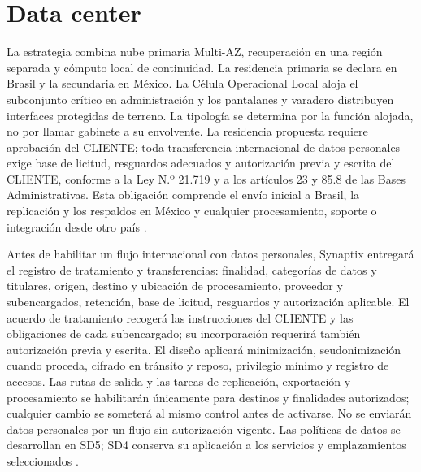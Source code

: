 

\section{Data center}

La estrategia combina nube primaria Multi-AZ, recuperación en una región separada y cómputo local de continuidad. La residencia primaria se declara en Brasil y la secundaria en México. La Célula Operacional Local aloja el subconjunto crítico en administración y los pantalanes y varadero distribuyen interfaces protegidas de terreno. La tipología se determina por la función alojada, no por llamar gabinete a su envolvente. La residencia propuesta requiere aprobación del CLIENTE; toda transferencia internacional de datos personales exige base de licitud, resguardos adecuados y autorización previa y escrita del CLIENTE, conforme a la Ley N.º 21.719 y a los artículos 23 y 85.8 de las Bases Administrativas. Esta obligación comprende el envío inicial a Brasil, la replicación y los respaldos en México y cualquier procesamiento, soporte o integración desde otro país \parencite[art.~23, p.~17; art.~85.8, p.~44]{pucv-admin}.

Antes de habilitar un flujo internacional con datos personales, Synaptix entregará el registro de tratamiento y transferencias: finalidad, categorías de datos y titulares, origen, destino y ubicación de procesamiento, proveedor y subencargados, retención, base de licitud, resguardos y autorización aplicable. El acuerdo de tratamiento recogerá las instrucciones del CLIENTE y las obligaciones de cada subencargado; su incorporación requerirá también autorización previa y escrita. El diseño aplicará minimización, seudonimización cuando proceda, cifrado en tránsito y reposo, privilegio mínimo y registro de accesos. Las rutas de salida y las tareas de replicación, exportación y procesamiento se habilitarán únicamente para destinos y finalidades autorizados; cualquier cambio se someterá al mismo control antes de activarse. No se enviarán datos personales por un flujo sin autorización vigente. Las políticas de datos se desarrollan en SD5; SD4 conserva su aplicación a los servicios y emplazamientos seleccionados \parencite[art.~85.1--4, p.~44]{pucv-admin}.

